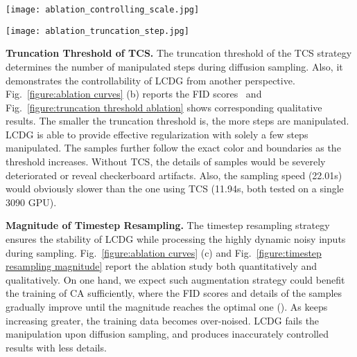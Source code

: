 \documentclass{article}
\begin{document}
\begin{figure*}[t!]
  \centering
  \texttt{[image: ablation\_controlling\_scale.jpg]} \vspace{-1em}
  \caption{Qualitative results for ablation studies of controlling scale.}
  \label{figure:controlling scale ablation}
  \vspace{-0.5em}
  \end{figure*}
  
  \begin{figure*}[t!]
  \centering
  \texttt{[image: ablation\_truncation\_step.jpg]} \vspace{-1em}
  \caption{Qualitative results for ablation studies of truncation threshold of TCS.}
  \label{figure:truncation threshold ablation}
  \vspace{-1em}  
\end{figure*}

\textbf{Truncation Threshold of TCS.} The truncation threshold of the TCS strategy determines the number of manipulated steps during diffusion sampling. Also, it demonstrates the controllability of LCDG from another perspective. Fig.~\ref{figure:ablation curves} (b) reports the FID scores~\cite{NIPS2017_8a1d6947} and Fig.~\ref{figure:truncation threshold ablation} shows corresponding qualitative results. The smaller the truncation threshold is, the more steps are manipulated. LCDG is able to provide effective regularization with solely a few steps manipulated. The samples further follow the exact color and boundaries as the threshold increases. Without TCS, the details of samples would be severely deteriorated or reveal checkerboard artifacts. Also, the sampling speed (22.01s) would obviously slower than the one using TCS (11.94s, both tested on a single 3090 GPU).

\textbf{Magnitude of Timestep Resampling.} The timestep resampling strategy ensures the stability of LCDG while processing the highly dynamic noisy inputs during sampling. Fig.~\ref{figure:ablation curves} (c) and Fig.~\ref{figure:timestep resampling magnitude} report the ablation study both quantitatively and qualitatively. On one hand, we expect such augmentation strategy could benefit the training of CA sufficiently, where the FID scores and details of the samples gradually improve until the magnitude reaches the optimal one (). As  keeps increasing greater, the training data becomes over-noised. LCDG fails the manipulation upon diffusion sampling, and produces inaccurately controlled results with less details.
\end{document}
